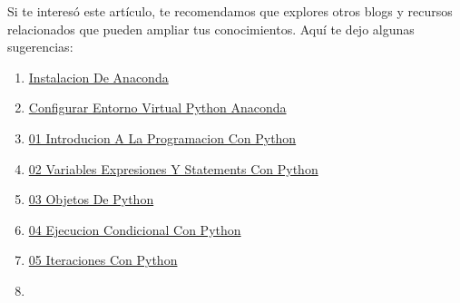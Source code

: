 \documentclass[
  doc,
  floatsintext,
  longtable,
  a4paper,
  nolmodern,
  notxfonts,
  notimes,
  12pt,
  colorlinks=true,linkcolor=blue,citecolor=blue,urlcolor=blue]{apa7}
\providecommand{\tightlist}{%
  \setlength{\itemsep}{0pt}\setlength{\parskip}{0pt}}
\begin{document}
Si te interesó este artículo, te recomendamos que explores otros blogs y
recursos relacionados que pueden ampliar tus conocimientos. Aquí te dejo
algunas sugerencias:

\begin{enumerate}
\def\labelenumi{\arabic{enumi}.}
\tightlist
\item
  \href{https://numerus-scriptum.netlify.app/python/2020-06-19-instalacion-de-anaconda/index.pdf}{}
  \href{https://numerus-scriptum.netlify.app/python/2020-06-19-instalacion-de-anaconda}{Instalacion
  De Anaconda}
\item
  \href{https://numerus-scriptum.netlify.app/python/2020-06-20-configurar-entorno-virtual-python-anaconda/index.pdf}{}
  \href{https://numerus-scriptum.netlify.app/python/2020-06-20-configurar-entorno-virtual-python-anaconda}{Configurar
  Entorno Virtual Python Anaconda}
\item
  \href{https://numerus-scriptum.netlify.app/python/2021-04-17-01-introducion-a-la-programacion-con-python/index.pdf}{}
  \href{https://numerus-scriptum.netlify.app/python/2021-04-17-01-introducion-a-la-programacion-con-python}{01
  Introducion A La Programacion Con Python}
\item
  \href{https://numerus-scriptum.netlify.app/python/2021-05-31-02-variables-expresiones-y-statements-con-python/index.pdf}{}
  \href{https://numerus-scriptum.netlify.app/python/2021-05-31-02-variables-expresiones-y-statements-con-python}{02
  Variables Expresiones Y Statements Con Python}
\item
  \href{https://numerus-scriptum.netlify.app/python/2021-06-07-03-objetos-de-python/index.pdf}{}
  \href{https://numerus-scriptum.netlify.app/python/2021-06-07-03-objetos-de-python}{03
  Objetos De Python}
\item
  \href{https://numerus-scriptum.netlify.app/python/2021-06-14-04-ejecucion-condicional-con-python/index.pdf}{}
  \href{https://numerus-scriptum.netlify.app/python/2021-06-14-04-ejecucion-condicional-con-python}{04
  Ejecucion Condicional Con Python}
\item
  \href{https://numerus-scriptum.netlify.app/python/2021-06-21-05-iteraciones-con-python/index.pdf}{}
  \href{https://numerus-scriptum.netlify.app/python/2021-06-21-05-iteraciones-con-python}{05
  Iteraciones Con Python}
\item
  \href{https://numerus-scriptum.netlify.app/python/2021-08-16-06-funciones-con-python/index.pdf}{}

\end{enumerate}
\end{document}
